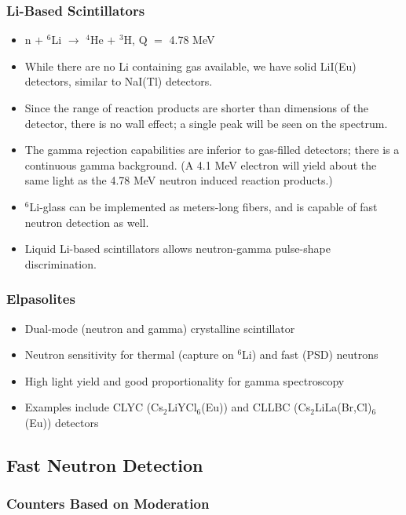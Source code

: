 \subsubsection{Li-Based Scintillators}
\begin{itemize}
    \item n $+$ $^6$Li $\rightarrow$ $^4$He $+$ $^3$H, Q $=$ 4.78 MeV
    \item While there are no Li containing gas available, we have solid LiI(Eu) detectors, similar to NaI(Tl) detectors.
    \item Since the range of reaction products are shorter than dimensions of the detector, there is no wall effect; a single peak will be seen on the spectrum.
    \item The gamma rejection capabilities are inferior to gas-filled detectors; there is a continuous gamma background. (A 4.1 MeV electron will yield about the same light as the 4.78 MeV neutron induced reaction products.)
    \item $^6$Li-glass can be implemented as meters-long fibers, and is capable of fast neutron detection as well. 
    \item Liquid Li-based scintillators allows neutron-gamma pulse-shape discrimination.
\end{itemize}
\subsubsection{Elpasolites}
\begin{itemize}
    \item Dual-mode (neutron and gamma) crystalline scintillator
    \item Neutron sensitivity for thermal (capture on $^6$Li) and fast (PSD) neutrons
    \item High light yield and good proportionality for gamma spectroscopy
    \item Examples include CLYC (Cs$_2$LiYCl$_6$(Eu)) and CLLBC (Cs$_2$LiLa(Br,Cl)$_6$(Eu)) detectors
\end{itemize}

\subsection{Fast Neutron Detection}


\subsubsection{Counters Based on Moderation}


